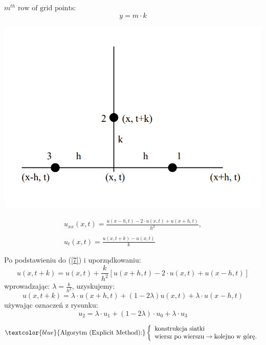 \begin{frame}
$ m^{th} \text{ row of grid points:}$
$$y = m \cdot k$$
\centerline{\includegraphics[height = 0.55 \textheight]{img/23/stabilnosc2}}

\begin{block}{}
   $$ \begin{array}{l}
   u_{xx}(x,t) = \frac{u(x-h,t)-2 \cdot u(x,t) + u(x+h,t)}{h^{2}}, \\ \\
   u_t (x,t)= \frac{u(x,t+k)-u(x,t)}{k}
   \end{array}$$
 \end{block}

\end{frame}

\begin{frame}
Po podstawieniu do (\ref{7}) i uporządkowaniu:
$$u(x,t+k) = u(x,t) + \frac{k}{h^2}[u(x+h,t)-2\cdot u(x,t)+u(x-h,t)]$$
wprowadzając: $\lambda = \frac{k}{h^2}$, uzyskujemy:
$$u(x,t+k) = \lambda \cdot u(x+h,t)+(1-2\lambda)u(x,t)+\lambda \cdot u(x-h,t)$$
używając oznaczeń z rysunku:
$$u_2 = \lambda \cdot u_1+(1-2\lambda)\cdot u_0+\lambda \cdot u_3$$


$$ \textcolor{blue}{\text{Algorytm (Explicit Method):}}\left
\{ \begin{array}{lrl}
       \text{konstrukcja siatki}\\
       \text{wiersz po wierszu} \rightarrow \text{kolejno w górę.}
        \end{array} \right. $$
\end{frame}

